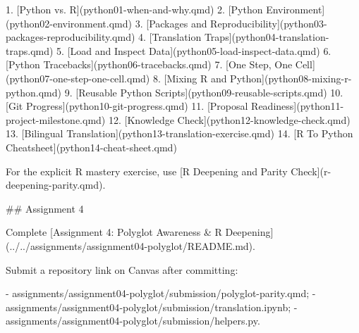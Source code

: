 \documentclass[
  letterpaper,
  DIV=11,
  numbers=noendperiod,
  oneside]{scrreprt}
\newenvironment{Shaded}{\begin{snugshade}}{\end{snugshade}}
\newcommand{\CommentTok}[1]{\textcolor[rgb]{0.37,0.37,0.37}{#1}}
\newcommand{\FunctionTok}[1]{\textcolor[rgb]{0.28,0.35,0.67}{#1}}
\newcommand{\InformationTok}[1]{\textcolor[rgb]{0.37,0.37,0.37}{#1}}
\newcommand{\NormalTok}[1]{\textcolor[rgb]{0.00,0.23,0.31}{#1}}
\newcommand{\OtherTok}[1]{\textcolor[rgb]{0.00,0.23,0.31}{#1}}
\newcommand{\SpecialStringTok}[1]{\textcolor[rgb]{0.13,0.47,0.30}{#1}}
\begin{document}
\begin{Shaded}
\begin{Highlighting}[numbers=left,,]
\SpecialStringTok{1. }\CommentTok{[}\OtherTok{Python vs. R}\CommentTok{](python01{-}when{-}and{-}why.qmd)}
\SpecialStringTok{2. }\CommentTok{[}\OtherTok{Python Environment}\CommentTok{](python02{-}environment.qmd)}
\SpecialStringTok{3. }\CommentTok{[}\OtherTok{Packages and Reproducibility}\CommentTok{](python03{-}packages{-}reproducibility.qmd)}
\SpecialStringTok{4. }\CommentTok{[}\OtherTok{Translation Traps}\CommentTok{](python04{-}translation{-}traps.qmd)}
\SpecialStringTok{5. }\CommentTok{[}\OtherTok{Load and Inspect Data}\CommentTok{](python05{-}load{-}inspect{-}data.qmd)}
\SpecialStringTok{6. }\CommentTok{[}\OtherTok{Python Tracebacks}\CommentTok{](python06{-}tracebacks.qmd)}
\SpecialStringTok{7. }\CommentTok{[}\OtherTok{One Step, One Cell}\CommentTok{](python07{-}one{-}step{-}one{-}cell.qmd)}
\SpecialStringTok{8. }\CommentTok{[}\OtherTok{Mixing R and Python}\CommentTok{](python08{-}mixing{-}r{-}python.qmd)}
\SpecialStringTok{9. }\CommentTok{[}\OtherTok{Reusable Python Scripts}\CommentTok{](python09{-}reusable{-}scripts.qmd)}
\SpecialStringTok{10. }\CommentTok{[}\OtherTok{Git Progress}\CommentTok{](python10{-}git{-}progress.qmd)}
\SpecialStringTok{11. }\CommentTok{[}\OtherTok{Proposal Readiness}\CommentTok{](python11{-}project{-}milestone.qmd)}
\SpecialStringTok{12. }\CommentTok{[}\OtherTok{Knowledge Check}\CommentTok{](python12{-}knowledge{-}check.qmd)}
\SpecialStringTok{13. }\CommentTok{[}\OtherTok{Bilingual Translation}\CommentTok{](python13{-}translation{-}exercise.qmd)}
\SpecialStringTok{14. }\CommentTok{[}\OtherTok{R To Python Cheatsheet}\CommentTok{](python14{-}cheat{-}sheet.qmd)}

\NormalTok{For the explicit R mastery exercise, use }\CommentTok{[}\OtherTok{R Deepening and Parity Check}\CommentTok{](r{-}deepening{-}parity.qmd)}\NormalTok{.}

\FunctionTok{\#\# Assignment 4}

\NormalTok{Complete }\CommentTok{[}\OtherTok{Assignment 4: Polyglot Awareness \& R Deepening}\CommentTok{](../../assignments/assignment04{-}polyglot/README.md)}\NormalTok{.}

\NormalTok{Submit a repository link on Canvas after committing:}

\SpecialStringTok{{-} }\InformationTok{\textasciigrave{}assignments/assignment04{-}polyglot/submission/polyglot{-}parity.qmd\textasciigrave{}}\NormalTok{;}
\SpecialStringTok{{-} }\InformationTok{\textasciigrave{}assignments/assignment04{-}polyglot/submission/translation.ipynb\textasciigrave{}}\NormalTok{;}
\SpecialStringTok{{-} }\InformationTok{\textasciigrave{}assignments/assignment04{-}polyglot/submission/helpers.py\textasciigrave{}}\NormalTok{.}


\end{Highlighting}
\end{Shaded}
\end{document}
